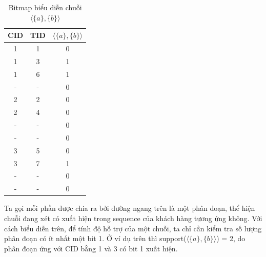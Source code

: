 \documentclass[a4paper 14pt]{article}
\begin{document}
					\begin{table}[H]
						\begin{minipage}[t]{0.5\linewidth}
							\begin{tabular}{| c | c | c |}
								\hline
								CID & TID & $\langle \{a\}, \{b\} \rangle$\\
								\hline
								1 & 1 & 0 \\
								1 & 3 & 1 \\
								1 & 6 & 1 \\
								- & - & 0 \\
								\hline
								2 & 2 & 0 \\
								2 & 4 & 0 \\
								- & - & 0 \\
								- & - & 0 \\
								\hline
								3 & 5 & 0 \\
								3 & 7 & 1 \\
								- & - & 0 \\
								- & - & 0 \\
								\hline
							\end{tabular}
							\caption{Bitmap biểu diễn chuỗi $\langle \{a\}, \{b\} \rangle$}
						\end{minipage}
					\end{table}
				Ta gọi mỗi phần được chia ra bởi đường ngang trên là một phân đoạn, thể hiện chuỗi đang xét có xuất hiện trong sequence của khách hàng tương ứng không. Với cách biểu diễn trên, để tính độ hỗ trợ của một chuỗi, ta chỉ cần kiểm tra số lượng phân đoạn có ít nhất một bit 1. Ở ví dụ trên thì support($\langle \{a\}, \{b\} \rangle$) = 2, do phân đoạn ứng với CID bằng 1 và 3 có bit 1 xuất hiện. 
\end{document}
